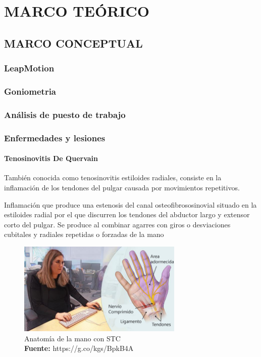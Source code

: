\chapter{MARCO TEÓRICO}
\section{MARCO CONCEPTUAL}
\subsection{LeapMotion}
\subsection{Goniometria}
\subsection{Análisis de puesto de trabajo}
\subsection{Enfermedades y lesiones}
\subsubsection{Tenosinovitis De Quervain}
También conocida como tenosinovitis estiloides radiales, consiste en la inflamación de los tendones del pulgar causada por movimientos repetitivos.

Inflamación que produce una estenosis del canal osteofibrososinovial situado en la estiloides radial por el que discurren los tendones del abductor largo y extensor corto del
pulgar. Se produce al combinar agarres con giros o desviaciones cubitales y radiales repetidas o forzadas de la mano
\begin{figure}[H]
    \centering
    \includegraphics[width=0.7\textwidth]{Anexos/LATEX/chapters/images/STC.jpg}
    \caption{Anatomía de la mano con STC \\\textbf{Fuente:} https://g.co/kgs/BpkB4A}
    \label{STC}
\end{figure}
